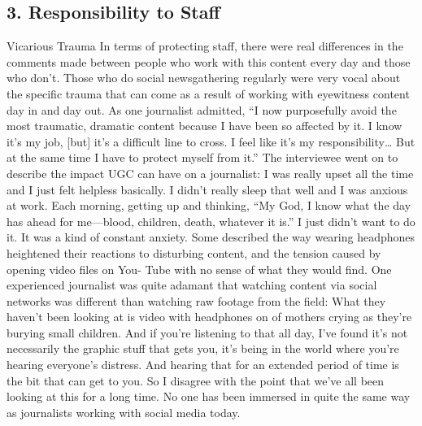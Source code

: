 \begin{enumerate}
\section{3. Responsibility to Staff}
Vicarious Trauma
In terms of protecting staff, there were real differences in the comments
made between people who work with this content every day and those who
don't. Those who do social newsgathering regularly were very vocal about
the specific trauma that can come as a result of working with eyewitness
content day in and day out. As one journalist admitted, ``I now purposefully
avoid the most traumatic, dramatic content because I have been so affected
by it. I know it's my job, [but] it's a difficult line to cross. I feel like it's my
responsibility… But at the same time I have to protect myself from it.'' The
interviewee went on to describe the impact UGC can have on a journalist:
I was really upset all the time and I just felt helpless basically. I didn't
really sleep that well and I was anxious at work. Each morning, getting
up and thinking, ``My God, I know what the day has ahead for
me—blood, children, death, whatever it is.'' I just didn't want to do it.
It was a kind of constant anxiety.
Some described the way wearing headphones heightened their reactions to
disturbing content, and the tension caused by opening video files on You-
Tube with no sense of what they would find. One experienced journalist was
quite adamant that watching content via social networks was different than
watching raw footage from the field:
What they haven't been looking at is video with headphones on of
mothers crying as they're burying small children. And if you're listening
to that all day, I've found it's not necessarily the graphic stuff
that gets you, it's being in the world where you're hearing everyone's
distress. And hearing that for an extended period of time is the bit
that can get to you. So I disagree with the point that we've all been
looking at this for a long time. No one has been immersed in quite
the same way as journalists working with social media today.


\end{enumerate}
